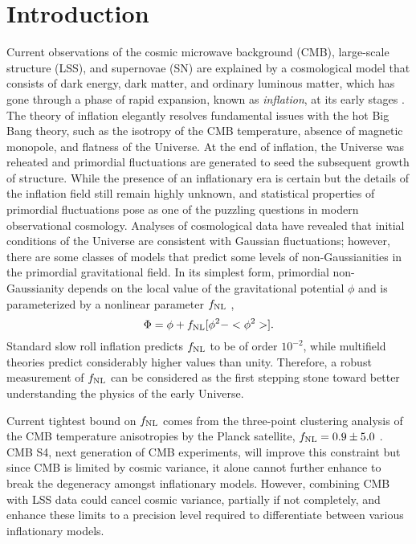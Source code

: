 \section{Introduction}
\label{sec:introduction}
Current observations of the cosmic microwave background (CMB), large-scale structure (LSS), and supernovae (SN) are explained by a cosmological model that consists of dark energy, dark matter, and ordinary luminous matter, which has gone through a phase of rapid expansion, known as \textit{inflation},  at its early stages \citep[see, e.g.,][]{weinberg2013observational}. The theory of inflation elegantly resolves fundamental issues with the hot Big Bang theory, such as the isotropy of the CMB temperature, absence of magnetic monopole, and flatness of the Universe. At the end of inflation, the Universe was reheated and primordial fluctuations are generated to seed the subsequent growth of structure. While the presence of an inflationary era is certain but the details of the inflation field still remain highly unknown, and statistical properties of primordial fluctuations pose as one of the puzzling questions in modern observational cosmology. Analyses of cosmological data have revealed that initial conditions of the Universe are consistent with Gaussian fluctuations; however, there are some classes of models that predict some levels of non-Gaussianities in the primordial gravitational field. In its simplest form, primordial non-Gaussianity depends on the local value of the gravitational potential $\phi$ and is parameterized by a nonlinear parameter $f_{\rm NL}$ \citep{komatsu2001acoustic},
\begin{equation}
    \Phi = \phi + f_{\rm NL} [\phi^{2} -  <\phi^{2}>].
\end{equation}
Standard slow roll inflation predicts $f_{\rm NL}$ to be of order $10^{-2}$, while multifield theories predict considerably higher values than unity. Therefore, a robust measurement of $f_{\rm NL}$ can be considered as the first stepping stone toward better understanding the physics of the early Universe. 


Current tightest bound on $f_{\rm NL}$ comes from the three-point clustering analysis of the CMB temperature anisotropies by the Planck satellite, $f_{\rm NL}=0.9\pm 5.0$ \citep{akrami2019planck}. CMB S4, next generation of CMB experiments, will improve this constraint but since CMB is limited by cosmic variance, it alone cannot further enhance to break the degeneracy amongst inflationary models. However, combining CMB with LSS data could cancel cosmic variance, partially if not completely, and enhance these limits to a precision level required to differentiate between various inflationary models.  

